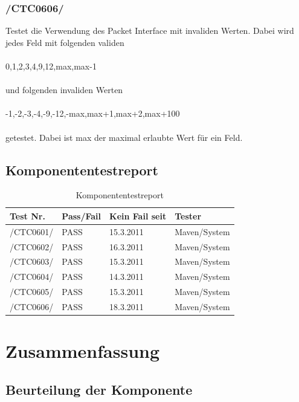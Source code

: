 \subsection{/CTC0606/} 
Testet die Verwendung des Packet Interface mit invaliden Werten. 
Dabei wird jedes Feld mit folgenden validen \\\\
0,1,2,3,4,9,12,max,max-1 \\\\
und folgenden invaliden Werten \\\\
-1,-2,-3,-4,-9,-12,-max,max+1,max+2,max+100 \\\\
getestet. Dabei ist max der maximal erlaubte Wert für ein Feld.

\section{Komponententestreport}

\begin{table}[h]
\caption{Komponententestreport}
\label{tab:ktr}
\begin{center}
\begin{tabular}{|p{2cm}|p{2cm}|p{4cm}|p{5  cm}|}
\hline
\textbf{Test Nr.} & \textbf{Pass/Fail} & \textbf{Kein Fail seit} & \textbf{Tester}\\
\hline
/CTC0601/ & PASS & 15.3.2011 & Maven/System\\
\hline
/CTC0602/ & PASS & 16.3.2011 & Maven/System\\
\hline
/CTC0603/ & PASS & 15.3.2011 & Maven/System\\
\hline
/CTC0604/ & PASS & 14.3.2011 & Maven/System\\
\hline
/CTC0605/ & PASS & 15.3.2011 & Maven/System\\
\hline
/CTC0606/ & PASS & 18.3.2011 & Maven/System\\
\hline
\end{tabular}
\end{center}
\end{table}

\chapter{Zusammenfassung}

\section{Beurteilung der Komponente}



